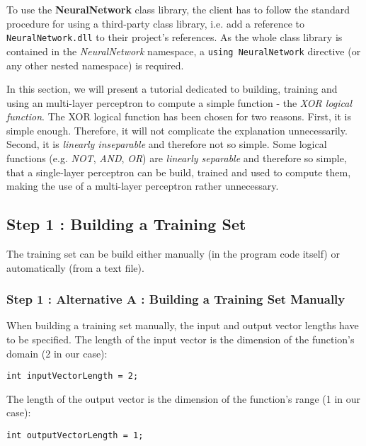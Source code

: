 To use the \textbf{NeuralNetwork} class library, the client has to follow the standard procedure for using a third-party class library, i.e. add a reference to \texttt{NeuralNetwork.dll} to their project's references. As the whole class library is contained in the \textit{NeuralNetwork} namespace, a \texttt{using NeuralNetwork} directive (or any other nested namespace) is required.

In this section, we will present a tutorial dedicated to building, training and using an multi-layer perceptron to compute a simple function - the \textit{XOR logical function}. The XOR logical function has been chosen for two reasons. First, it is simple enough. Therefore, it will not complicate the explanation unnecessarily. Second, it is \textit{linearly inseparable} and therefore not so simple. Some logical functions (e.g. \textit{NOT}, \textit{AND}, \textit{OR}) are \textit{linearly separable} and therefore so simple, that a single-layer perceptron can be build, trained and used to compute them, making the use of a multi-layer perceptron rather unnecessary.

\subsection{Step 1 : Building a Training Set}

The training set can be build either manually (in the program code itself) or automatically (from a text file).

\subsubsection{Step 1 : Alternative A : Building a Training Set Manually}

When building a training set manually, the input and output vector lengths have to be specified. The length of the input vector is the dimension of the function's domain (2 in our case):

\medskip

\begin{verbatim}
int inputVectorLength = 2;
\end{verbatim}

\medskip

The length of the output vector is the dimension of the function's range (1 in our case):

\medskip

\begin{verbatim}
int outputVectorLength = 1;
\end{verbatim}

